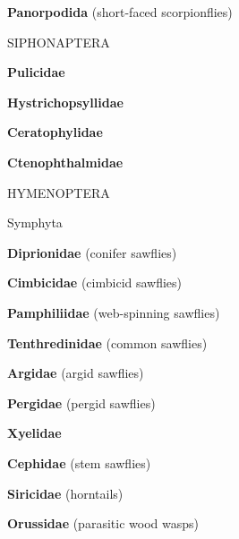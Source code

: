 \documentclass[letterpaper,10pt]{article}
\begin{document}
{\makebox[0.6cm]{}  \textbf{Panorpodida} (short-faced scorpionflies) \par
%
%
%
\makebox[0.0cm]{}  SIPHONAPTERA \par
\makebox[0.6cm]{}  \textbf{Pulicidae} \par
\makebox[0.6cm]{}  \textbf{Hystrichopsyllidae} \par
\makebox[0.6cm]{}  \textbf{Ceratophylidae} \par
\makebox[0.6cm]{}  \textbf{Ctenophthalmidae} \par
%
%
%	
\makebox[0.0cm]{}  HYMENOPTERA\par
\makebox[0.20cm]{}  Symphyta \par
\makebox[0.6cm]{}  \textbf{Diprionidae} (conifer sawflies) \par
\makebox[0.6cm]{}  \textbf{Cimbicidae} (cimbicid sawflies) \par
\makebox[0.6cm]{}  \textbf{Pamphiliidae} (web-spinning sawflies) \par
\makebox[0.6cm]{}  \textbf{Tenthredinidae} (common sawflies) \par
\makebox[0.6cm]{}  \textbf{Argidae} (argid sawflies) \par
\makebox[0.6cm]{}  \textbf{Pergidae} (pergid sawflies) \par
\makebox[0.6cm]{}  \textbf{Xyelidae} \par
\makebox[0.6cm]{}  \textbf{Cephidae} (stem sawflies) \par
\makebox[0.6cm]{}  \textbf{Siricidae} (horntails) \par
\makebox[0.6cm]{}  \textbf{Orussidae} (parasitic wood wasps) \par
}
\end{document}
